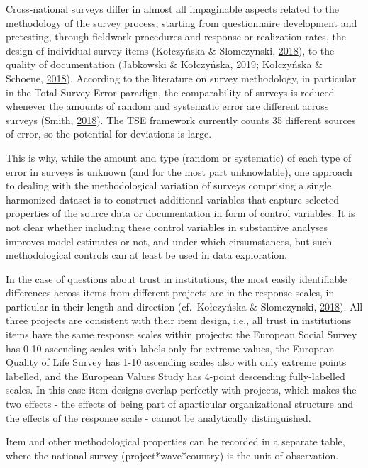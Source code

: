 \documentclass[12pt,]{article}
\begin{document}
Cross-national surveys differ in almost all impaginable aspects related to the methodology of the survey process, starting from questionnaire development and pretesting, through fieldwork procedures and response or realization rates, the design of individual survey items (Kołczyńska \& Slomczynski, \protect\hyperlink{ref-KolczynskaSlomczynski2018}{2018}), to the quality of documentation (Jabkowski \& Kołczyńska, \protect\hyperlink{ref-Jabkowski2019}{2019}; Kołczyńska \& Schoene, \protect\hyperlink{ref-KolczynskaSchoene2018}{2018}). According to the literature on survey methodology, in particular in the Total Survey Error paradign, the comparability of surveys is reduced whenever the amounts of random and systematic error are different across surveys (Smith, \protect\hyperlink{ref-Smith2018}{2018}). The TSE framework currently counts 35 different sources of error, so the potential for deviations is large.

This is why, while the amount and type (random or systematic) of each type of error in surveys is unknown (and for the most part unknowlable), one approach to dealing with the methodological variation of surveys comprising a single harmonized dataset is to construct additional variables that capture selected properties of the source data or documentation in form of control variables. It is not clear whether including these control variables in substantive analyses improves model estimates or not, and under which cirsumstances, but such methodological controls can at least be used in data exploration.

In the case of questions about trust in institutions, the most easily identifiable differences across items from different projects are in the response scales, in particular in their length and direction (cf.~Kołczyńska \& Slomczynski, \protect\hyperlink{ref-KolczynskaSlomczynski2018}{2018}). All three projects are consistent with their item design, i.e., all trust in institutions items have the same response scales within projects: the European Social Survey has 0-10 ascending scales with labels only for extreme values, the European Quality of Life Survey has 1-10 ascending scales also with only extreme points labelled, and the European Values Study has 4-point descending fully-labelled scales. In this case item designs overlap perfectly with projects, which makes the two effects - the effects of being part of aparticular organizational structure and the effects of the response scale - cannot be analytically distinguished.

Item and other methodological properties can be recorded in a separate table, where the national survey (project*wave*country) is the unit of observation.
\end{document}
